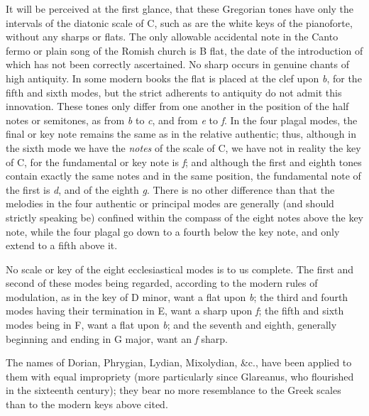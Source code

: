 It will be perceived at the first glance,
\pagebreak
that these Gregorian tones have only
the intervals of the diatonic scale of C, such as are the white keys of the pianoforte,
without any sharps or flats. The only allowable accidental note in the Canto
fermo or plain song of the Romish church is B flat, the date of the introduction
of which has not been correctly ascertained. No sharp occurs in genuine chants
of high antiquity. In some modern books the flat is placed at the clef upon \textit{b}, for
the fifth and sixth modes, but the strict adherents to antiquity do not admit this
innovation. These tones only differ from one another in the position of the half
notes or semitones, as from \textit{b} to \textit{c}, and from \textit{e} to \textit{f}. In the four plagal modes, the
final or key note remains the same as in the relative authentic; thus, although in the
sixth mode we have the \textit{notes} of the scale of C, we have not in reality the key of
C, for the fundamental or key note is \textit{f}; and although the first and eighth tones
contain exactly the same notes and in the same position, the fundamental note of
the first is \textit{d}, and of the eighth \textit{g}. There is no other difference than that the
melodies in the four authentic or principal modes are generally (and should
strictly speaking be) confined within the compass of the eight notes above the key
note, while the four plagal go down to a fourth below the key note, and only
extend to a fifth above it.

No scale or key of the eight ecclesiastical modes is to us complete. The first
and second of these modes being regarded, according to the modern rules of
modulation, as in the key of D minor, want a flat upon \textit{b}; the third and fourth
modes having their termination in E, want a sharp upon \textit{f}; the fifth and sixth
modes being in F, want a flat upon \textit{b}; and the seventh and eighth, generally
beginning and ending in G major, want an \textit{f} sharp.

The names of Dorian, Phrygian, Lydian, Mixolydian, \&c., have been applied to
them with equal impropriety (more particularly since Glareanus, who flourished
in the sixteenth century); they bear no more resemblance to the Greek scales than
to the modern keys above cited.

